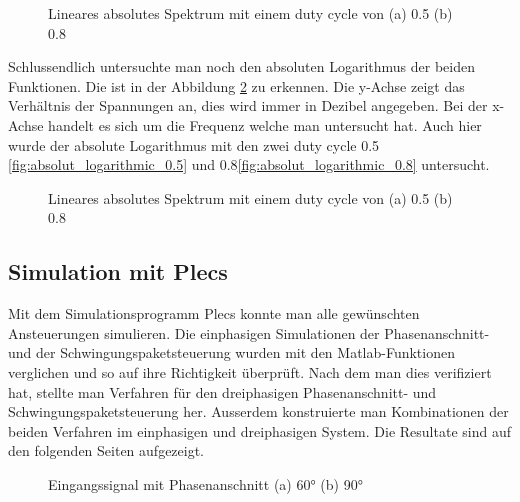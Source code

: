 \begin{figure}[h]
	\centering
	\qquad
	\caption{Lineares absolutes Spektrum mit einem duty cycle von (a) 0.5 (b) 0.8}
	\label{fig:Schwingungspaketspektrum Matlab}
\end{figure}

Schlussendlich untersuchte man noch den absoluten Logarithmus der beiden Funktionen. Die ist in der Abbildung \ref{fig:absolut_logaritmic_matlab} zu erkennen. Die y-Achse zeigt das Verhältnis der Spannungen an, dies wird immer in Dezibel angegeben. Bei der x-Achse handelt es sich um die Frequenz welche man untersucht hat. Auch hier wurde der absolute Logarithmus mit den zwei duty cycle 0.5 \ref{fig:absolut_logarithmic_0.5} und 0.8\ref{fig:absolut_logarithmic_0.8} untersucht.


\begin{figure}[h]
	\centering
	\qquad
	\caption{Lineares absolutes Spektrum mit einem duty cycle von (a) 0.5 (b) 0.8}
	\label{fig:absolut_logaritmic_matlab}
\end{figure}
\newpage
\subsection{Simulation mit Plecs}

Mit dem Simulationsprogramm Plecs konnte man alle gewünschten Ansteuerungen simulieren. Die einphasigen Simulationen der Phasenanschnitt- und der Schwingungspaketsteuerung wurden mit den Matlab-Funktionen verglichen und so auf ihre Richtigkeit überprüft. Nach dem man dies verifiziert hat, stellte man Verfahren für den dreiphasigen Phasenanschnitt- und Schwingungspaketsteuerung her. Ausserdem konstruierte man Kombinationen der beiden Verfahren im einphasigen und dreiphasigen System. Die Resultate sind auf den folgenden Seiten aufgezeigt.

\begin{figure}[h]
	\centering
	\qquad
	\caption{Eingangssignal mit Phasenanschnitt (a) 60° (b) 90°}
	\label{fig:Eingangssignal simuliert mit Plecs}
\end{figure}




 


